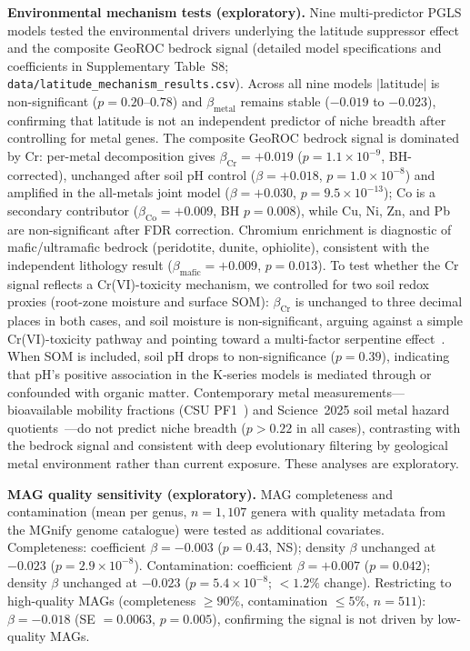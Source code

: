 \documentclass[times]{zHenriquesLab-StyleBioRxiv}
\begin{document}
\textbf{Environmental mechanism tests (exploratory).} Nine multi-predictor PGLS models tested the environmental drivers underlying the latitude suppressor effect and the composite GeoROC bedrock signal (detailed model specifications and coefficients in Supplementary Table~S8; \texttt{data/latitude\_mechanism\_results.csv}). Across all nine models $|\mathrm{latitude}|$ is non-significant ($p = 0.20$--$0.78$) and $\beta_\mathrm{metal}$ remains stable ($-0.019$ to $-0.023$), confirming that latitude is not an independent predictor of niche breadth after controlling for metal genes. The composite GeoROC bedrock signal is dominated by Cr: per-metal decomposition gives $\beta_\mathrm{Cr} = +0.019$ ($p = 1.1 \times 10^{-9}$, BH-corrected), unchanged after soil pH control ($\beta = +0.018$, $p = 1.0 \times 10^{-8}$) and amplified in the all-metals joint model ($\beta = +0.030$, $p = 9.5 \times 10^{-13}$); Co is a secondary contributor ($\beta_\mathrm{Co} = +0.009$, BH $p = 0.008$), while Cu, Ni, Zn, and Pb are non-significant after FDR correction. Chromium enrichment is diagnostic of mafic/ultramafic bedrock (peridotite, dunite, ophiolite), consistent with the independent lithology result ($\beta_\mathrm{mafic} = +0.009$, $p = 0.013$). To test whether the Cr signal reflects a Cr(VI)-toxicity mechanism, we controlled for two soil redox proxies (root-zone moisture and surface SOM): $\beta_\mathrm{Cr}$ is unchanged to three decimal places in both cases, and soil moisture is non-significant, arguing against a simple Cr(VI)-toxicity pathway and pointing toward a multi-factor serpentine effect~\cite{oline2006}. When SOM is included, soil pH drops to non-significance ($p = 0.39$), indicating that pH's positive association in the K-series models is mediated through or confounded with organic matter. Contemporary metal measurements---bioavailable mobility fractions (CSU PF1~\cite{qi2025}) and Science~2025 soil metal hazard quotients~\cite{hou2025}---do not predict niche breadth ($p > 0.22$ in all cases), contrasting with the bedrock signal and consistent with deep evolutionary filtering by geological metal environment rather than current exposure. These analyses are exploratory.

\textbf{MAG quality sensitivity (exploratory).} MAG completeness and
contamination (mean per genus, $n = 1{,}107$ genera with quality metadata from
the MGnify genome catalogue) were tested as additional covariates.
Completeness: coefficient $\beta = -0.003$ ($p = 0.43$, NS); density $\beta$
unchanged at $-0.023$ ($p = 2.9 \times 10^{-8}$). Contamination: coefficient
$\beta = +0.007$ ($p = 0.042$); density $\beta$ unchanged at $-0.023$
($p = 5.4 \times 10^{-8}$; ${<}1.2\%$ change). Restricting to high-quality
MAGs (completeness $\geq 90\%$, contamination $\leq 5\%$, $n = 511$):
$\beta = -0.018$ (SE $= 0.0063$, $p = 0.005$), confirming the signal is not
driven by low-quality MAGs.
\end{document}
